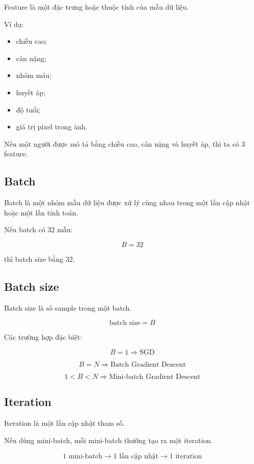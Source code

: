 Feature là một đặc trưng hoặc thuộc tính của mẫu dữ liệu.

Ví dụ:

\begin{itemize}
    \item chiều cao;
    \item cân nặng;
    \item nhóm máu;
    \item huyết áp;
    \item độ tuổi;
    \item giá trị pixel trong ảnh.
\end{itemize}

Nếu một người được mô tả bằng chiều cao, cân nặng và huyết áp, thì ta có 3 feature.

\subsection{Batch}

Batch là một nhóm mẫu dữ liệu được xử lý cùng nhau trong một lần cập nhật hoặc một lần tính toán.

Nếu batch có 32 mẫu:

\[
    B=32
\]

thì batch size bằng 32.

\subsection{Batch size}

Batch size là số sample trong một batch.

\[
    \text{batch size}=B
\]

Các trường hợp đặc biệt:

\[
    B=1
    \Rightarrow
    \text{SGD}
\]

\[
    B=N
    \Rightarrow
    \text{Batch Gradient Descent}
\]

\[
    1<B<N
    \Rightarrow
    \text{Mini-batch Gradient Descent}
\]

\subsection{Iteration}

Iteration là một lần cập nhật tham số.

Nếu dùng mini-batch, mỗi mini-batch thường tạo ra một iteration.

\[
    \text{1 mini-batch}
    \rightarrow
    \text{1 lần cập nhật}
    \rightarrow
    \text{1 iteration}
\]

